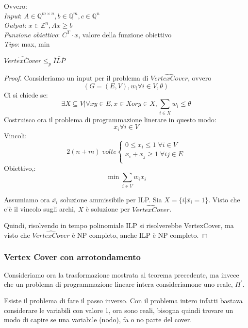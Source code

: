 Ovvero:\\
\emph{Input}: $A \in \mathbb{Q}^{m\times n}, b \in \mathbb{Q}^m, c \in \mathbb{Q}^n$\\
\emph{Output}: $x \in \mathbb{Z}^n, Ax \geq b$\\
\emph{Funzione obiettivo}: $C^T \cdot x$, valore della funzione obiettivo\\
\emph{Tipo}: max, min\\

\begin{theorem}
    $\hat{\mathit{VertexCover}} \leq_p \hat{\mathit{ILP}}$ 
\end{theorem}
\begin{proof}
    Consideriamo un input per il problema di $\hat{\mathit{VertexCover}}$, ovvero $$(G=(E,V), w_i \forall i \in V, \theta)$$
    Ci si chiede se: $$\exists X \subseteq V | \forall xy \in E, x \in X \mathit{or} y \in X, \sum_{i\in X} w_i \leq \theta$$
    Costruisco ora il problema di programmazione linerare in questo modo:
    $$x_i \forall i \in V$$
    Vincoli:
    \[
        2(n+m)\;\mathit{volte}
        \begin{cases}
            0 \leq x_i \leq 1  \;\forall i \in V\\
            x_i + x_j \geq 1 \;\forall ij \in E\\
        \end{cases}
    \]
    Obiettivo,:
    $$\min \sum_{i\in V} w_ix_i$$

    Assumiamo ora $\bar{x_i}$ soluzione ammissibile per ILP. Sia $X = \{ i | \bar{x_i} = 1\}$.
    Visto che c'è il vincolo sugli archi, $X$ è soluzione per $\hat{\mathit{VertexCover}}$.

    Quindi, risolvendo in tempo polinomiale ILP si risolverebbe VertexCover, ma 
    visto che $\hat{\mathit{VertexCover}}$ è NP completo, anche ILP è NP completo.
\end{proof}

\subsubsection{Vertex Cover con arrotondamento}
Consideriamo ora la trasformazione mostrata al teorema precedente, ma invece
che un problema di programmazione lineare intera consideriamone uno reale, $\Pi^\prime$.

Esiste il problema di fare il passo inverso. Con il problema intero infatti 
bastava considerare le variabili con valore 1, ora sono reali, bisogna quindi trovare un 
modo di capire se una variabile (nodo), fa o no parte del cover.

